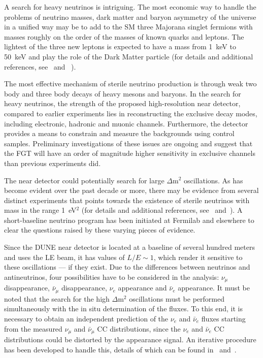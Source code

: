 A search for heavy neutrinos is intriguing. 
The most economic way to handle the problems of neutrino masses, dark matter and baryon asymmetry of the universe in a unified way may be to add to the SM three Majorana singlet fermions with masses roughly on the order of the masses of known quarks and leptons. 
 The lightest of the three new leptons is expected to have a mass from 1~keV to 50~keV and play the role of the Dark Matter particle (for details and additional references, see~\cite{DPR} and ~\cite{Adams:2013qkq}).

The most effective  mechanism of sterile neutrino production is through weak two body and three body decays of heavy mesons and baryons. In the search for heavy neutrinos, the strength of the proposed high-resolution near detector, compared to earlier experiments lies in reconstructing the exclusive decay modes, including electronic, hadronic and muonic channels. Furthermore, the detector provides a means to constrain and measure the backgrounds using control samples. Preliminary investigations of these issues are ongoing and  suggest that the FGT  will have an order of magnitude higher sensitivity in exclusive channels than previous experiments did. 


The near detector could potentially search for large $\Delta$m$^2$ oscillations. As has become evident over the past decade or more, there may be evidence from several distinct experiments that points towards the existence of sterile neutrinos with mass in the range 1~eV$^2$ (for details and additional references, see~\cite{DPR} and~\cite{Adams:2013qkq}).  A short-baseline neutrino program has been initiated at Fermilab and elsewhere to clear the questions raised by these varying pieces of evidence.  

Since the DUNE near detector is located at a baseline of several hundred meters and uses the LE beam, it has values of  $L/E \sim 1$, which render it sensitive to these oscillations --- if they exist. Due to the differences between neutrinos and antineutrinos,  four possibilities have to be considered in the analysis: 
$\nu_\mu$ disappearance,  $\bar \nu_\mu$ disappearance, $\nu_e$ appearance and $\bar \nu_e$  appearance. 
It must be noted that  the search for the high
 $\Delta$m$^2$ oscillations must be performed simultaneously with the in situ determination of the fluxes. 
To this end, it is necessary to obtain an independent prediction of the $\nu_e$  and $\bar \nu_e$  fluxes starting from the measured $\nu_\mu$ and  $\bar \nu_\mu$ CC distributions, since the  $\nu_e$  and $\bar \nu_e$ CC distributions could be distorted by the appearance signal. An iterative procedure has been developed to handle this, details of which can be found in~\cite{DPR} and~\cite{Adams:2013qkq}.\\

